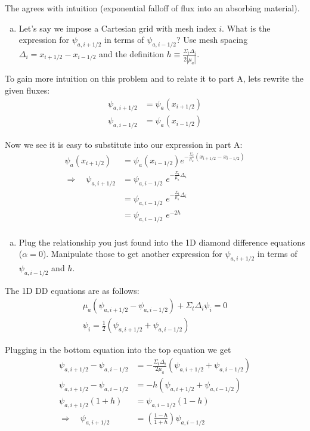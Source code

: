 \documentclass[10pt]{article}
\begin{document}
The agrees with intuition (exponential falloff of flux into an absorbing material).

%
%
%

\vspace{10pt}
\begin{enumerate}[(b)]
\item Let's say we impose a Cartesian grid with mesh index $i$. What is the expression for $\psi_{a,i+1/2}$ in terms of $\psi_{a,i-1/2}$? Use mesh spacing $\Delta_i = x_{i+1/2} - x_{i-1/2}$ and the definition $h \equiv \frac{\Sigma_t \Delta_i}{2|\mu_a|}$.
\end{enumerate}

To gain more intuition on this problem and to relate it to part A, lets rewrite the given fluxes:
%
\begin{align*}
    \psi_{a,i+1/2} &= \psi_a(x_{i+1/2}) \\
    \psi_{a,i-1/2} &= \psi_a(x_{i-1/2})
\end{align*}

Now we see it is easy to substitute into our expression in part A:
%
\begin{align*}
     \psi_a(x_{i+1/2}) &= \psi_a(x_{i-1/2})e^{-\frac{\Sigma_t}{\mu_a }(x_{i+1/2} - x_{i-1/2})} \\
     \Rightarrow \quad \psi_{a,i+1/2} &= \psi_{a,i-1/2}\,\,e^{-\frac{\Sigma_t}{\mu_a }\Delta_i} \\
     &= \psi_{a,i-1/2}\,\,e^{-\frac{\Sigma_t}{\mu_a }\Delta_i} \\
     &= \psi_{a,i-1/2}\,\,e^{-2h} \\
\end{align*}

%
%
%

\begin{enumerate}[(c)]
\item Plug the relationship you just found into the 1D diamond difference equations ($\alpha = 0$). Manipulate those to get another expression for
 $\psi_{a,i+1/2}$ in terms of $\psi_{a,i-1/2}$ and $h$.
\end{enumerate}

The 1D DD equations are as follows:
%
\begin{align*}
    \mu_a(\psi_{a,i+1/2} - \psi_{a,i-1/2}) + \Sigma_t \Delta_i \psi_i = 0 \\
    \psi_i = \frac{1}{2}(\psi_{a,i+1/2} + \psi_{a,i-1/2})
\end{align*}

Plugging in the bottom equation into the top equation we get
%
\begin{align*}
    \psi_{a,i+1/2} - \psi_{a,i-1/2} &= -\frac{\Sigma_t \Delta_i}{2\mu_a} (\psi_{a,i+1/2} + \psi_{a,i-1/2}) \\
    \psi_{a,i+1/2} - \psi_{a,i-1/2} &= -h (\psi_{a,i+1/2} + \psi_{a,i-1/2}) \\
    \psi_{a,i+1/2}(1+h) &= \psi_{a,i-1/2}(1-h) \\
    \Rightarrow \quad \psi_{a,i+1/2} &= \left(\frac{1-h}{1+h}\right)\psi_{a,i-1/2}
\end{align*}
\end{document}
